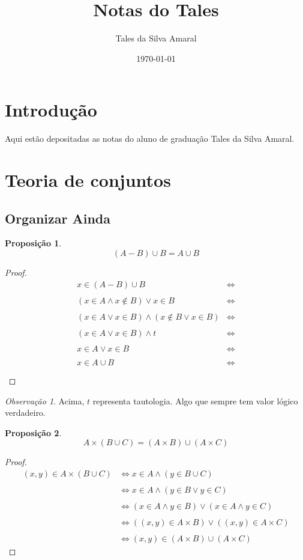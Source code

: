\documentclass{article}
\title{Notas do Tales}
\author{Tales da Silva Amaral}
\date{\today}
\theoremstyle{plain}
\newtheorem{prop}{Proposição}[section]
\theoremstyle{definition}
\theoremstyle{remark}
\newtheorem{obs}{Observação}[section]
\begin{document}
\maketitle
\newpage
\tableofcontents
\newpage

\section{Introdução}

Aqui estão depositadas as notas do aluno de graduação Tales da Silva Amaral.  

\section{Teoria de conjuntos}
\subsection{Organizar Ainda}
\begin{prop}
	$$(A-B)\cup B =  A\cup B$$
\end{prop}
\begin{proof}
	\begin{align*}
		x\in (A-B)\cup B &\iff \\~\\
		(x\in A \land x \not \in B) \lor x\in B &\iff \\~\\
		(x\in A\lor x\in B)  \land( x \not \in B \lor x\in B) &\iff \\~\\
		(x\in A\lor x\in B)  \land t &\iff \\~\\
		x\in A\lor x\in B &\iff \\~\\
		x \in A \cup B  &\iff \\~\\
	\end{align*}
\end{proof}
\begin{obs}
	Acima, $t$ representa tautologia.  Algo que sempre tem valor lógico verdadeiro.
\end{obs}
\begin{prop}
	$$A\times (B\cup C ) = (A\times B )\cup( A\times C)$$
\end{prop}
\begin{proof}
	\begin{align*}
		(x,y) \in A\times (B\cup C ) & \iff 
		x\in A \land (y\in B\cup C)  \\~\\ &\iff 
		x\in A \land (y\in B\lor y\in  C)  \\~\\& \iff
		(x\in A \land y\in B) \lor (x\in A \land y\in  C)  \\~\\& \iff
		((x,y)\in A\times B) \lor  ((x,y)\in  A\times C) \\~\\ & \iff
		(x,y)\in (A\times B) \cup  (A\times C)
	\end{align*}
\end{proof}
\end{document}
